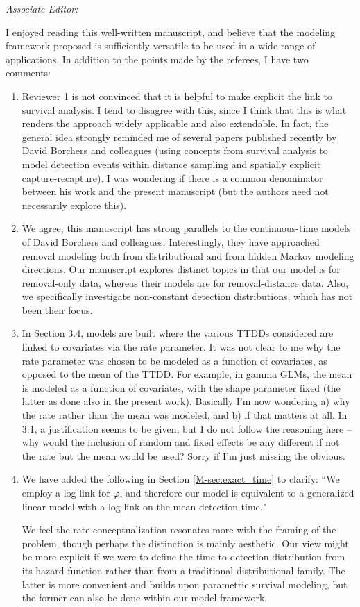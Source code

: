 \documentclass[12pt]{article}
\renewenvironment{quote}  %
              {\list{}{\rightmargin\leftmargin}\normalfont%
               \item\relax}
              {\endlist}
\begin{document}
\itshape
Associate Editor:

I enjoyed reading this well-written manuscript, and believe that the modeling framework proposed is sufficiently versatile to be used in a wide range of applications. In addition to the points made by the referees, I have two comments:
\begin{enumerate}
\item Reviewer 1 is not convinced that it is helpful to make explicit the link to survival analysis. I tend to disagree with this, since I think that this is what renders the approach widely applicable and also extendable. In fact, the general idea strongly reminded me of several papers published recently by David Borchers and colleagues (using concepts from survival analysis to model detection events within distance sampling and spatially explicit capture-recapture). I was wondering if there is a common denominator between his work and the present manuscript (but the authors need not necessarily explore this).
\begin{quote}
We agree, this manuscript has strong parallels to the continuous-time models of David Borchers and colleagues.  
Interestingly, they have approached removal modeling both from distributional and from hidden Markov modeling directions.
Our manuscript explores distinct topics in that our model is for removal-only data, whereas their models are for removal-distance data.
Also, we specifically investigate non-constant detection distributions, which has not been their focus.
\end{quote}


\item In Section 3.4, models are built where the various TTDDs considered are linked to covariates via the rate parameter. It was not clear to me why the rate parameter was chosen to be modeled as a function of covariates, as opposed to the mean of the TTDD. For example, in gamma GLMs, the mean is modeled as a function of covariates, with the shape parameter fixed (the latter as done also in the present work). Basically I'm now wondering a) why the rate rather than the mean was modeled, and b) if that matters at all. In 3.1, a justification seems to be given, but I do not follow the reasoning here – why would the inclusion of random and fixed effects be any different if not the rate but the mean would be used? Sorry if I'm just missing the obvious.
\begin{quote}
We have added the following in Section \ref{M-sec:exact_time} to clarify: ``We employ a log link for $\varphi$, and therefore our model is equivalent to a generalized linear model with a log link on the mean detection time."

We feel the rate conceptualization resonates more with the framing of the problem, though perhaps the distinction is mainly aesthetic.
Our view might be more explicit if we were to define the time-to-detection distribution from its hazard function rather than from a traditional distributional family. 
The latter is more convenient and builds upon parametric survival modeling, but the former can also be done within our model framework.
\end{quote}
\end{enumerate}
\end{document}
